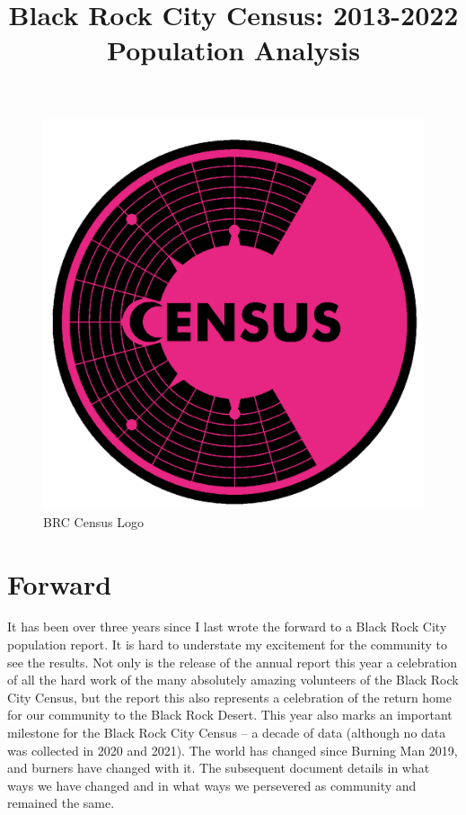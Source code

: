 \documentclass[
]{book}
\title{Black Rock City Census: 2013-2022 Population Analysis}
\author{}
\date{\vspace{-2.5em}}
\begin{document}
\maketitle

{
\setcounter{tocdepth}{1}
\tableofcontents
}
\begin{figure}
\centering
\includegraphics{images/Logo.PNG}
\caption{BRC Census Logo}
\end{figure}

\hypertarget{forward}{%
\chapter*{Forward}\label{forward}}

It has been over three years since I last wrote the forward to a Black
Rock City population report. It is hard to understate my excitement for the
community to see the results. Not only is the release of the annual report this year a
celebration of all the hard work of the many absolutely amazing volunteers of the Black Rock City
Census, but the report this also represents a celebration of the return home
for our community to the Black Rock Desert. This year also marks an important
milestone for the Black Rock City Census -- a decade of data (although no data was collected
in 2020 and 2021). The world has changed since Burning Man 2019,
and burners have changed with it. The subsequent document details in what
ways we have changed and in what ways we persevered as community and remained
the same.
\end{document}

